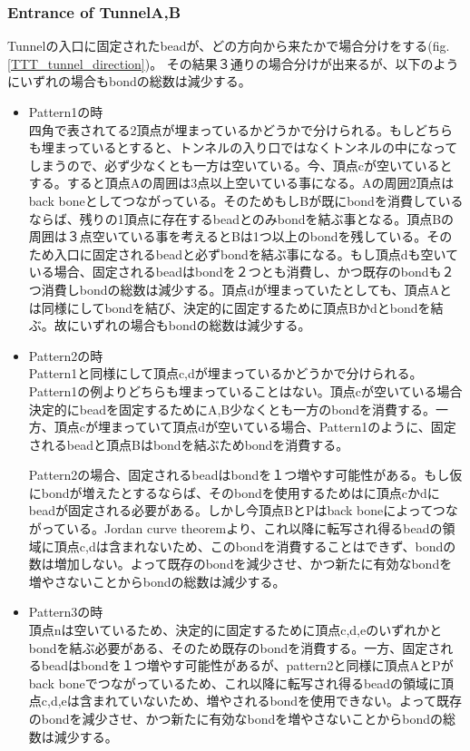 \documentclass[a4,dvipdfmx,11pt]{article}
\theoremstyle{definition}
\begin{document}
\subsubsection{Entrance of TunnelA,B}
Tunnelの入口に固定されたbeadが、どの方向から来たかで場合分けをする(fig.\ref{TTT_tunnel_direction})。
その結果３通りの場合分けが出来るが、以下のようにいずれの場合もbondの総数は減少する。

\begin{itemize}
\item{Pattern1の時}\\
  四角で表されてる2頂点が埋まっているかどうかで分けられる。もしどちらも埋まっているとすると、トンネルの入り口ではなくトンネルの中になってしまうので、必ず少なくとも一方は空いている。今、頂点cが空いているとする。すると頂点Aの周囲は3点以上空いている事になる。Aの周囲2頂点はback boneとしてつながっている。そのためもしBが既にbondを消費しているならば、残りの1頂点に存在するbeadとのみbondを結ぶ事となる。頂点Bの周囲は３点空いている事を考えるとBは1つ以上のbondを残している。そのため入口に固定されるbeadと必ずbondを結ぶ事になる。もし頂点dも空いている場合、固定されるbeadはbondを２つとも消費し、かつ既存のbondも２つ消費しbondの総数は減少する。頂点dが埋まっていたとしても、頂点Aとは同様にしてbondを結び、決定的に固定するために頂点Bかdとbondを結ぶ。故にいずれの場合もbondの総数は減少する。

\item{Pattern2の時}\\
  Pattern1と同様にして頂点c,dが埋まっているかどうかで分けられる。Pattern1の例よりどちらも埋まっていることはない。頂点cが空いている場合決定的にbeadを固定するためにA,B少なくとも一方のbondを消費する。一方、頂点cが埋まっていて頂点dが空いている場合、Pattern1のように、固定されるbeadと頂点Bはbondを結ぶためbondを消費する。

  Pattern2の場合、固定されるbeadはbondを１つ増やす可能性がある。もし仮にbondが増えたとするならば、そのbondを使用するためはに頂点cかdにbeadが固定される必要がある。しかし今頂点BとPはback boneによってつながっている。Jordan curve theoremより、これ以降に転写され得るbeadの領域に頂点c,dは含まれないため、このbondを消費することはできず、bondの数は増加しない。よって既存のbondを減少させ、かつ新たに有効なbondを増やさないことからbondの総数は減少する。

\item{Pattern3の時}\\
  頂点nは空いているため、決定的に固定するために頂点c,d,eのいずれかとbondを結ぶ必要がある、そのため既存のbondを消費する。一方、固定されるbeadはbondを１つ増やす可能性があるが、pattern2と同様に頂点AとPがback boneでつながっているため、これ以降に転写され得るbeadの領域に頂点c,d,eは含まれていないため、増やされるbondを使用できない。よって既存のbondを減少させ、かつ新たに有効なbondを増やさないことからbondの総数は減少する。
  
\end{itemize}
\end{document}
